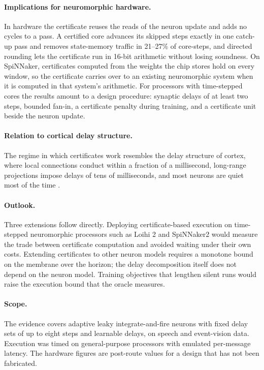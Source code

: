 \documentclass{iopjournal}
\begin{document}
\paragraph{Implications for neuromorphic hardware.} In hardware the certificate reuses the reads of the neuron update and adds no cycles to a pass. A certified core advances its skipped steps exactly in one catch-up pass and removes state-memory traffic in 21--27\% of core-steps, and directed rounding lets the certificate run in 16-bit arithmetic without losing soundness. On SpiNNaker, certificates computed from the weights the chip stores hold on every window, so the certificate carries over to an existing neuromorphic system when it is computed in that system's arithmetic. For processors with time-stepped cores the results amount to a design procedure: synaptic delays of at least two steps, bounded fan-in, a certificate penalty during training, and a certificate unit beside the neuron update.

\paragraph{Relation to cortical delay structure.} The regime in which certificates work resembles the delay structure of cortex, where local connections conduct within a fraction of a millisecond, long-range projections impose delays of tens of milliseconds, and most neurons are quiet most of the time \cite{conduction,sparsefiring}.

\paragraph{Outlook.} Three extensions follow directly. Deploying certificate-based execution on time-stepped neuromorphic processors such as Loihi 2 \cite{loihi2runtime} and SpiNNaker2 \cite{spinnaker2chip} would measure the trade between certificate computation and avoided waiting under their own costs. Extending certificates to other neuron models requires a monotone bound on the membrane over the horizon; the delay decomposition itself does not depend on the neuron model. Training objectives that lengthen silent runs would raise the execution bound that the oracle measures.

\paragraph{Scope.} The evidence covers adaptive leaky integrate-and-fire neurons with fixed delay sets of up to eight steps and learnable delays, on speech and event-vision data. Execution was timed on general-purpose processors with emulated per-message latency. The hardware figures are post-route values for a design that has not been fabricated.
\end{document}

